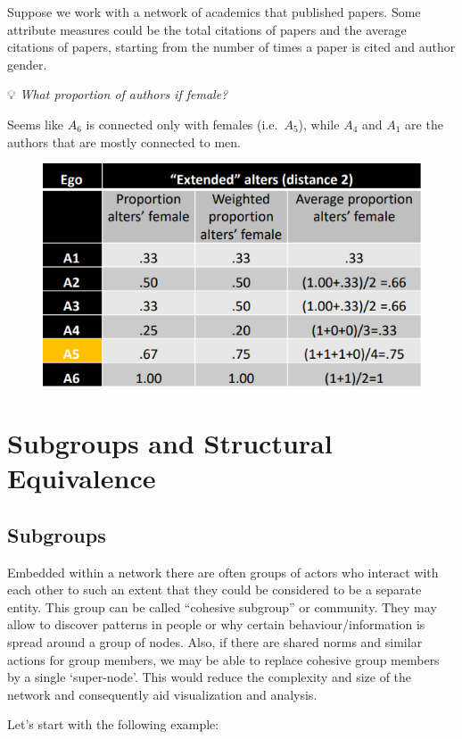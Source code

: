 \documentclass[
  notitlepage,
  onecolumn,
  openany]{book}
\begin{document}
Suppose we work with a network of academics that published papers. Some attribute measures could be the total citations of papers and the average citations of papers, starting from the number of times a paper is cited and author gender.

💡 \emph{What proportion of authors if female?}

Seems like \(A_6\) is connected only with females (i.e.~\(A_5\)), while \(A_4\) and \(A_1\) are the authors that are mostly connected to men.

\begin{figure}[h!]

{\centering \includegraphics[width=0.5\linewidth]{images/10-Two mode networks/Untitled 14} 

}

\end{figure}

\hypertarget{subgroups-and-structural-equivalence}{%
\chapter{Subgroups and Structural Equivalence}\label{subgroups-and-structural-equivalence}}

\hypertarget{subgroups}{%
\section{Subgroups}\label{subgroups}}

Embedded within a network there are often groups of actors who interact with each other to such an extent that they could be considered to be a separate entity. This group can be called ``cohesive subgroup'' or community. They may allow to discover patterns in people or why certain behaviour/information is spread around a group of nodes. Also, if there are shared norms and similar actions for group members, we may be able to replace cohesive group members by a single `super-node'. This would reduce the complexity and size of the network and consequently aid visualization and analysis.

Let's start with the following example:
\end{document}
